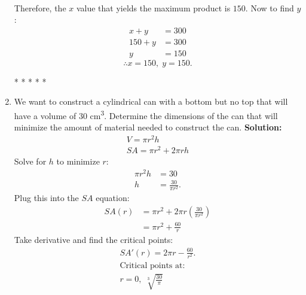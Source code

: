 \documentclass[12pt]{article}
\begin{document}
\begin{enumerate}
\begin{align*}
                    \end{align*}
                    Therefore, the $x$ value that yields the maximum product is $150$. Now to find $y$:
                    \begin{align*}
                        x + y &= 300 \\
                        150 + y &= 300 \\
                        y &= 150
                    \end{align*}
                    \[ \therefore x=150, \; y=150. \]
                    \begin{center}
                        * * * * *
                    \end{center}

                \item We want to construct a cylindrical can with a bottom but no top that will have a volume of $30$ cm\textsuperscript{3}. Determine the dimensions of the can that will minimize the amount of material needed to construct the can.
                \newline \newline
                    \textbf{Solution:}
                    \begin{gather*}
                        V = \pi r^2 h \\
                        SA = \pi r^2 + 2\pi rh
                    \end{gather*}
                    Solve for $h$ to minimize $r$:
                    \begin{align*}
                        \pi r^2 h &= 30 \\
                        h &= \frac{30}{\pi r^2}.
                    \end{align*}
                    Plug this into the $SA$ equation:
                    \begin{align*}
                        SA(r) &= \pi r^2 + 2\pi r \left( \frac{30}{\pi r^2} \right) \\[6pt]
                        &= \pi r^2 + \frac{60}{r}
                    \end{align*}
                    Take derivative and find the critical points:
                    \begin{gather*}
                        SA'(r) = 2 \pi r - \frac{60}{r^2}. \\[6pt]
                        \text{Critical points at:} \\
                        r = 0, \; \sqrt[3]{\frac{30}{\pi}} \\[6pt]

\end{gather*}
\end{enumerate}
\end{document}

